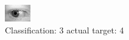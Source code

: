 \begin{figure}[h!]
\begin{center}
\includegraphics[width=0.60\columnwidth]{figures/ID702_class_3_target_4.png}
\end{center}
\caption{ Classification: 3 actual target: 4}
\label{fig:ID702_class_3_target_4}
\end{figure}
